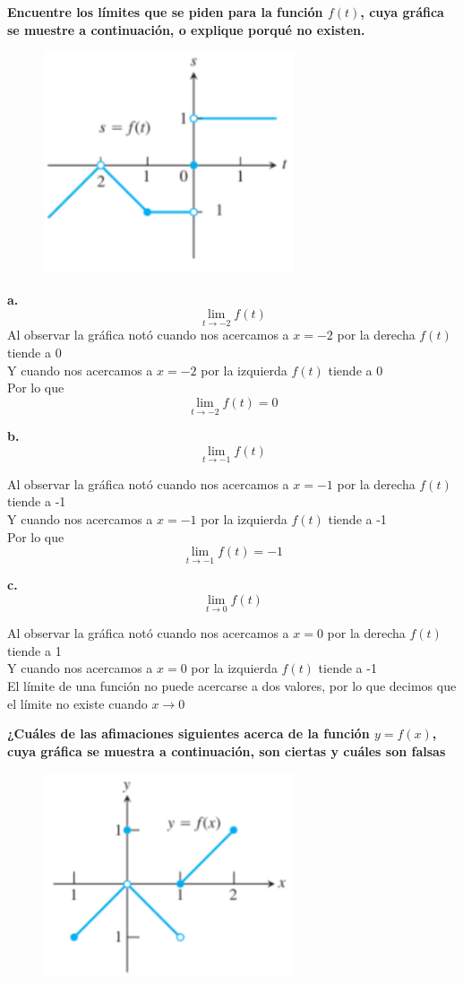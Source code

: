 \documentclass[12pt, letterpaper]{article}
\begin{document}
\textbf{Encuentre los límites que se piden para la función $f(t)$, cuya gráfica se muestre a continuación, o explique porqué no existen.}

\begin{figure}[ht]
\centering
\includegraphics[width=20em]{t8dos}
\end{figure}

\textbf{a.} \[ \lim_{t \to -2} f(t)\]
Al observar la gráfica notó cuando nos acercamos a $x = -2$  por la derecha $f(t)$ tiende a 0\\
Y cuando nos acercamos a $x = -2$ por la izquierda $f(t)$ tiende a 0\\
Por lo que \[ \lim_{t \to -2} f(t) = 0\]


\textbf{b.} \[ \lim_{t \to -1} f(t)\]

Al observar la gráfica notó cuando nos acercamos a $x = -1$  por la derecha $f(t)$ tiende a -1\\
Y cuando nos acercamos a $x = -1$ por la izquierda $f(t)$ tiende a -1\\
Por lo que \[ \lim_{t \to -1} f(t) = -1\]

\textbf{c.} \[ \lim_{t \to 0} f(t)\]

Al observar la gráfica notó cuando nos acercamos a $x = 0$  por la derecha $f(t)$ tiende a 1\\
Y cuando nos acercamos a $x = 0$ por la izquierda $f(t)$ tiende a -1\\

El límite de una función no puede acercarse a dos valores, por lo que decimos que el límite no existe cuando $x \to 0$

\newpage 
\textbf{¿Cuáles de las afimaciones siguientes acerca de la función $y = f(x)$, cuya gráfica se muestra a continuación, son ciertas y cuáles son falsas}

\begin{figure}[ht]
\centering
\includegraphics[width=20em]{t8tres}
\end{figure}
\end{document}
